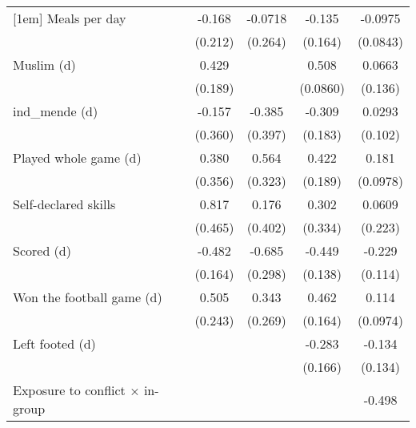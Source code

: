 {\begin{tabular}{l*{4}{c}}
[1em]
Meals per day       &      -0.168         &     -0.0718         &      -0.135         &     -0.0975         \\
                    &     (0.212)         &     (0.264)         &     (0.164)         &    (0.0843)         \\
[1em]
Muslim (d)          &       0.429\sym{**} &                     &       0.508\sym{***}&      0.0663         \\
                    &     (0.189)         &                     &    (0.0860)         &     (0.136)         \\
[1em]
ind\_mende (d)       &      -0.157         &      -0.385         &      -0.309\sym{*}  &      0.0293         \\
                    &     (0.360)         &     (0.397)         &     (0.183)         &     (0.102)         \\
[1em]
Played whole game (d)&       0.380         &       0.564\sym{*}  &       0.422\sym{**} &       0.181\sym{*}  \\
                    &     (0.356)         &     (0.323)         &     (0.189)         &    (0.0978)         \\
[1em]
Self-declared skills&       0.817\sym{*}  &       0.176         &       0.302         &      0.0609         \\
                    &     (0.465)         &     (0.402)         &     (0.334)         &     (0.223)         \\
[1em]
Scored (d)          &      -0.482\sym{***}&      -0.685\sym{**} &      -0.449\sym{***}&      -0.229\sym{**} \\
                    &     (0.164)         &     (0.298)         &     (0.138)         &     (0.114)         \\
[1em]
Won the football game (d)&       0.505\sym{**} &       0.343         &       0.462\sym{***}&       0.114         \\
                    &     (0.243)         &     (0.269)         &     (0.164)         &    (0.0974)         \\
[1em]
Left footed (d)     &                     &                     &      -0.283\sym{*}  &      -0.134         \\
                    &                     &                     &     (0.166)         &     (0.134)         \\
[1em]
Exposure to conflict × in-group&                     &                     &                     &      -0.498         \\

\end{tabular}}

